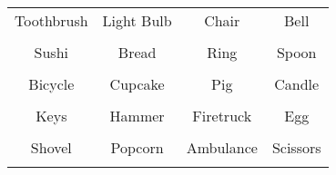 \documentclass[12pt,a4paper]{article}
\begin{document}
\thispagestyle{empty}
\begin{table}[]
\centering
\Huge
\begin{tabular}{cccc}
 Toothbrush& Light Bulb& Chair& Bell\\  & & & \\
 Sushi& Bread& Ring& Spoon\\  & & & \\
 Bicycle& Cupcake& Pig& Candle\\  & & & \\
 Keys& Hammer& Firetruck& Egg\\  & & & \\
 Shovel& Popcorn& Ambulance& Scissors\\  & & & \\
\end{tabular}
\end{table}
\end{document}
